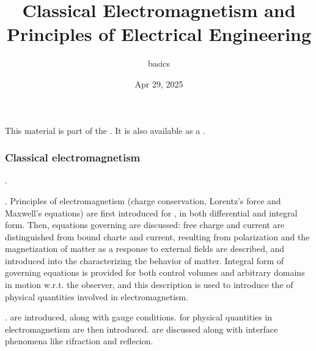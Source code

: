 \documentclass[letterpaper,10pt,english]{jupyterBook}
\title{Classical Electromagnetism and Principles of Electrical Engineering}
\date{Apr 29, 2025}
\author{basics}
\begin{document}
\pagestyle{empty}
\sphinxmaketitle
\pagestyle{plain}
\sphinxtableofcontents
\pagestyle{normal}
\label{\detokenize{intro::doc}}


\sphinxAtStartPar
This material is part of the . It is also available as a .
\subsubsection*{Classical electromagnetism}

\sphinxAtStartPar
{\hyperref[\detokenize{ch/experiments:classical-electromagnetism-first-experiments}]{}}. 

\sphinxAtStartPar
{\hyperref[\detokenize{ch/principles:classical-electromagnetism-principles}]{}}. Principles of electromagnetism (charge conservation, Lorentz’s force and Maxwell’s equations) are first introduced for {\hyperref[\detokenize{ch/principles-vacuum:classical-electromagnetism-principles-free-space}]{}}, in both differential and integral form. Then, equations governing {\hyperref[\detokenize{ch/principles-matter:classical-electromagnetism-principles-matter}]{}} are discussed: free charge and current are distinguished from bound charte and current, resulting from polarization and the magnetization of matter as a response to external fields are described, and introduced into the  characterizing the behavior of matter. Integral form of governing equations is provided for both control volumes and arbitrary domains in motion w.r.t. the observer, and this description is used to introduce the {\hyperref[\detokenize{ch/principles-relativity:classical-electromagnetism-principles-low-speed-relativity}]{}} of physical quantities involved in electromagnetism.

\sphinxAtStartPar
{\hyperref[\detokenize{ch/waves:classical-electromagnetism-waves}]{}}. {\hyperref[\detokenize{ch/potentials:classical-electromagnetism-potentials}]{}} are introduced, along with gauge conditions. {\hyperref[\detokenize{ch/waves-equation:classical-electromagnetism-waves-wave-equation}]{}} for physical quantities in electromagnetism are then introduced. {\hyperref[\detokenize{ch/waves-plane:classical-electromagnetism-waves-plane-waves}]{}} are discussed along with interface phenomena like rifraction and reflecion.
\end{document}
